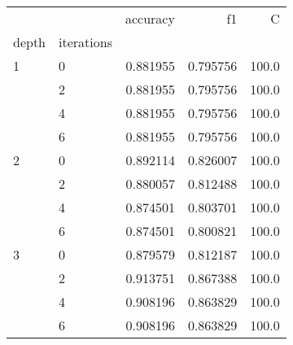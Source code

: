 \begin{tabular}{llrrr}
\toprule
  &   &  accuracy &        f1 &      C \\
depth & iterations &           &           &        \\
\midrule
1 & 0 &  0.881955 &  0.795756 &  100.0 \\
  & 2 &  0.881955 &  0.795756 &  100.0 \\
  & 4 &  0.881955 &  0.795756 &  100.0 \\
  & 6 &  0.881955 &  0.795756 &  100.0 \\
2 & 0 &  0.892114 &  0.826007 &  100.0 \\
  & 2 &  0.880057 &  0.812488 &  100.0 \\
  & 4 &  0.874501 &  0.803701 &  100.0 \\
  & 6 &  0.874501 &  0.800821 &  100.0 \\
3 & 0 &  0.879579 &  0.812187 &  100.0 \\
  & 2 &  0.913751 &  0.867388 &  100.0 \\
  & 4 &  0.908196 &  0.863829 &  100.0 \\
  & 6 &  0.908196 &  0.863829 &  100.0 \\
\bottomrule
\end{tabular}
